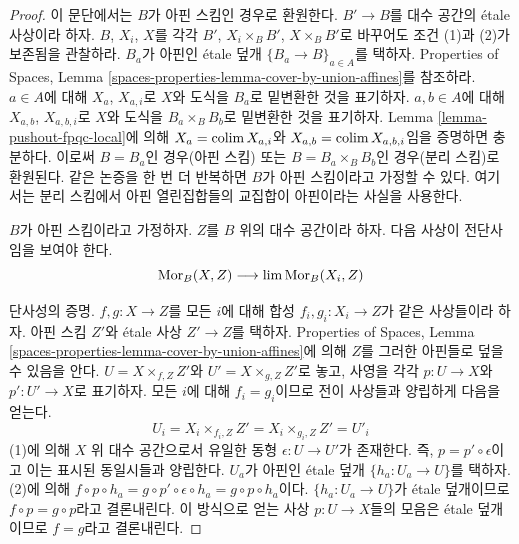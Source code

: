 \begin{proof}
이 문단에서는 $B$가 아핀 스킴인 경우로 환원한다.
$B' \to B$를 대수 공간의 \'etale 사상이라 하자.
$B$, $X_i$, $X$를 각각
$B'$, $X_i \times_B B'$, $X \times_B B'$로 바꾸어도
조건 (1)과 (2)가 보존됨을 관찰하라.
$B_a$가 아핀인 \'etale 덮개
$\{B_a \to B\}_{a \in A}$를 택하자. Properties of Spaces, Lemma
\ref{spaces-properties-lemma-cover-by-union-affines}를 참조하라.
$a \in A$에 대해 $X_a$, $X_{a, i}$로 $X$와 도식을
$B_a$로 밑변환한 것을 표기하자. $a, b \in A$에 대해
$X_{a, b}$, $X_{a, b, i}$로 $X$와 도식을
$B_a \times_B B_b$로 밑변환한 것을 표기하자.
Lemma \ref{lemma-pushout-fpqc-local}에 의해
$X_a = \mathop{\mathrm{colim}}\nolimits X_{a, i}$와
$X_{a, b} = \mathop{\mathrm{colim}}\nolimits X_{a, b, i}$임을 증명하면 충분하다.
이로써 $B = B_a$인 경우(아핀 스킴) 또는
$B = B_a \times_B B_b$인 경우(분리 스킴)로 환원된다.
같은 논증을 한 번 더 반복하면 $B$가 아핀 스킴이라고 가정할 수 있다.
여기서는 분리 스킴에서 아핀 열린집합들의 교집합이 아핀이라는
사실을 사용한다.

\medskip\noindent
$B$가 아핀 스킴이라고 가정하자. $Z$를 $B$ 위의 대수 공간이라 하자.
다음 사상이 전단사임을 보여야 한다.
$$
\mathop{\mathrm{Mor}}\nolimits_B(X, Z) \longrightarrow \mathop{\mathrm{lim}}\nolimits \mathop{\mathrm{Mor}}\nolimits_B(X_i, Z)
$$

\medskip\noindent
단사성의 증명. $f, g : X \to Z$를 모든 $i$에 대해 합성
$f_i, g_i : X_i \to Z$가 같은 사상들이라 하자.
아핀 스킴 $Z'$와 \'etale 사상 $Z' \to Z$를 택하자.
Properties of Spaces, Lemma
\ref{spaces-properties-lemma-cover-by-union-affines}에 의해
$Z$를 그러한 아핀들로 덮을 수 있음을 안다.
$U = X \times_{f, Z} Z'$와 $U' = X \times_{g, Z} Z'$로 놓고,
사영을 각각 $p : U \to X$와 $p' : U' \to X$로 표기하자.
모든 $i$에 대해 $f_i = g_i$이므로 전이 사상들과 양립하게
다음을 얻는다.
$$
U_i = X_i \times_{f_i, Z} Z' = X_i \times_{g_i, Z} Z' = U'_i
$$
(1)에 의해 $X$ 위 대수 공간으로서 유일한 동형
$\epsilon : U \to U'$가 존재한다. 즉,
$p = p' \circ \epsilon$이고 이는 표시된 동일시들과 양립한다.
$U_a$가 아핀인 \'etale 덮개 $\{h_a : U_a \to U\}$를 택하자.
(2)에 의해
$f \circ p \circ h_a = g \circ p' \circ \epsilon \circ h_a =
g \circ p \circ h_a$이다. $\{h_a : U_a \to U\}$가
\'etale 덮개이므로 $f \circ p = g \circ p$라고 결론내린다.
이 방식으로 얻는 사상 $p : U \to X$들의 모음은
\'etale 덮개이므로 $f = g$라고 결론내린다.


\end{proof}
